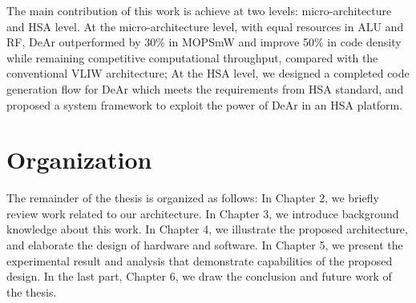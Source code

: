         The main contribution of this work is achieve at two levels: micro-architecture and HSA level. 
        At the micro-architecture level, with equal resources in ALU and RF, DeAr outperformed by 30\% in MOPS\/mW and improve 50\% in code density while remaining competitive computational throughput, compared with the conventional VLIW architecture;
        At the HSA level, we designed a completed code generation flow for DeAr which meets the requirements from HSA standard, and proposed a system framework to exploit the power of DeAr in an HSA platform.
    \section{Organization}
        The remainder of the thesis is organized as follows: In Chapter 2, we briefly review work related to our architecture. In Chapter 3, we introduce background knowledge about this work. In Chapter 4, we illustrate the proposed architecture, and elaborate the design of hardware and software. In Chapter 5, we present the experimental result and analysis that demonstrate capabilities of the proposed design. In the last part, Chapter 6, we draw the conclusion and future work of the thesis.


